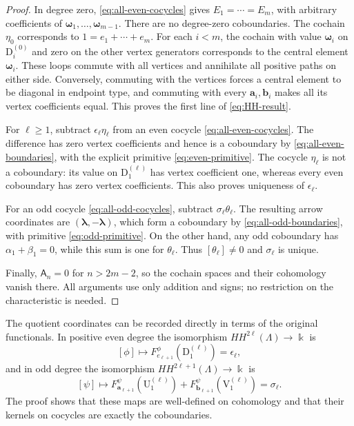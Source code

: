 \documentclass[a4paper,11pt,oneside,reqno]{amsart}
\theoremstyle{definition}
\numberwithin{equation}{section}
\begin{document}
	\begin{proof}
		In degree zero, \eqref{eq:all-even-cocycles} gives
		$E_1=\cdots=E_m$, with arbitrary coefficients of $\boldsymbol{\omega}_1,\ldots,\boldsymbol{\omega}_{m-1}$.
		There are no degree-zero coboundaries.  The cochain $\eta_0$ corresponds
		to $1=e_1+\cdots+e_m$.  For each $i<m$, the cochain with value $\boldsymbol{\omega}_i$ on
		$\mathrm{D}_i^{(0)}$ and zero on the other vertex generators corresponds to the
		central element $\boldsymbol{\omega}_i$.  These loops commute with all vertices and
		annihilate all positive paths on either side.  Conversely, commuting
		with the vertices forces a central element to be diagonal in endpoint
		type, and commuting with every $\mathbf{a}_i,\mathbf{b}_i$ makes all its vertex
		coefficients equal.  This proves the first line of \eqref{eq:HH-result}.
		
		For $\ell\geq1$, subtract $\epsilon_\ell\eta_\ell$ from an even
		cocycle \eqref{eq:all-even-cocycles}.  The difference has zero vertex
		coefficients and hence is a coboundary by
		\eqref{eq:all-even-boundaries}, with the explicit primitive
		\eqref{eq:even-primitive}.  The cocycle $\eta_\ell$ is not a
		coboundary: its value on $\mathrm{D}_1^{(\ell)}$ has vertex coefficient one,
		whereas every even coboundary has zero vertex coefficients.  This
		also proves uniqueness of $\epsilon_\ell$.
		
		For an odd cocycle \eqref{eq:all-odd-cocycles}, subtract
		$\sigma_\ell\theta_\ell$.  The resulting arrow coordinates are
		$(\boldsymbol\lambda,-\boldsymbol\lambda)$, which form a coboundary
		by \eqref{eq:all-odd-boundaries}, with primitive
		\eqref{eq:odd-primitive}.  On the other hand, any odd coboundary has
		$\alpha_1+\beta_1=0$, while this sum is one for $\theta_\ell$.
		Thus $[\theta_\ell]\ne0$ and $\sigma_\ell$ is unique.
		
		Finally, $\mathsf A_n=0$ for $n>2m-2$, so the cochain spaces and their
		cohomology vanish there.  All arguments use only addition and signs;
		no restriction on the characteristic is needed.
	\end{proof}
	
	The quotient coordinates can be recorded directly in terms of the
	original functionals.  In positive even degree the isomorphism
	$HH^{2\ell}(\Lambda)\to \Bbbk$ is
	\begin{equation}\label{eq:even-quotient-coordinate}
		[\phi]\longmapsto
		F_{e_{\ell+1}}^\phi(\mathrm{D}_1^{(\ell)})=\epsilon_\ell,
	\end{equation}
	and in odd degree the isomorphism $HH^{2\ell+1}(\Lambda)\to \Bbbk$ is
	\begin{equation}\label{eq:odd-quotient-coordinate}
		[\psi]\longmapsto
		F_{\mathbf{a}_{\ell+1}}^\psi(\mathrm{U}_1^{(\ell)})
		+F_{\mathbf{b}_{\ell+1}}^\psi(\mathrm{V}_1^{(\ell)})=\sigma_\ell.
	\end{equation}
	The proof shows that these maps are well-defined on cohomology and that
	their kernels on cocycles are exactly the coboundaries.
	
\end{document}
